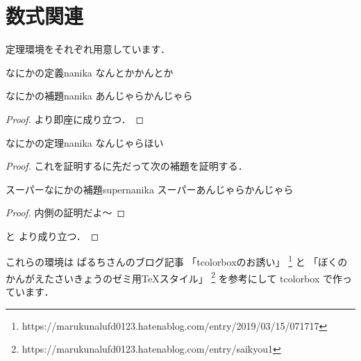\section{数式関連}

\par 定理環境をそれぞれ用意しています．

\begin{definition}{なにかの定義}{nanika}
  なんとかかんとか
\end{definition}
\begin{lemma}{なにかの補題}{nanika}
  あんじゃらかんじゃら
\end{lemma}
\begin{proof}
   より即座に成り立つ．
\end{proof}

\begin{theorem}{なにかの定理}{nanika}
  なんじゃらほい
\end{theorem}

\begin{proof}
  これを証明するに先だって次の補題を証明する．
  \begin{lemma}{スーパーなにかの補題}{supernanika}
    スーパーあんじゃらかんじゃら
  \end{lemma}
  \begin{proof}
    内側の証明だよ～
  \end{proof}
   と  より成り立つ．
\end{proof}

\par これらの環境は ぱるちさんのブログ記事
「tcolorboxのお誘い」 \footnote{https://marukunalufd0123.hatenablog.com/entry/2019/03/15/071717} と
「ぼくのかんがえたさいきょうのゼミ用TeXスタイル」 \footnote{https://marukunalufd0123.hatenablog.com/entry/saikyou1}
を参考にして tcolorbox で作っています．


